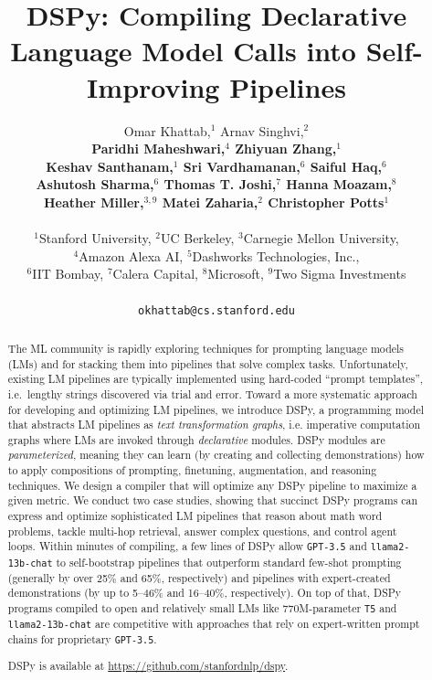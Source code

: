 \documentclass{article} %
\title{DSPy: Compiling Declarative Language Model Calls into Self-Improving Pipelines}
\author{Omar Khattab,$^{1}$ Arnav Singhvi,$^{2}$\\
\textbf{Paridhi Maheshwari,$^{4}$ Zhiyuan Zhang,$^{1}$} \\
\textbf{Keshav Santhanam,$^{1}$ Sri Vardhamanan,$^{6}$ Saiful Haq,$^{6}$} \\
\textbf{Ashutosh Sharma,$^{6}$ Thomas T. Joshi,$^{7}$ Hanna Moazam,$^{8}$} \\
\textbf{Heather Miller,${}^{3,9}$ Matei Zaharia,$^{2}$ 
Christopher Potts$^{1}$}
\\  \\
${}^{1}$Stanford University, 
${}^{2}$UC Berkeley, 
${}^{3}$Carnegie Mellon University,\\
${}^{4}$Amazon Alexa AI,
${}^{5}$Dashworks Technologies, Inc.,\\
${}^{6}$IIT Bombay,
${}^{7}$Calera Capital,
${}^{8}$Microsoft,
${}^{9}$Two Sigma Investments
\\
\\
\texttt{okhattab@cs.stanford.edu} \\
}
\newcommand{\gptThreeFive}{\texttt{GPT-3.5}}
\newcommand{\llamaThirteenChat}{\texttt{llama2-13b-chat}}
\begin{document}
\maketitle

\begin{abstract} %

The ML community is rapidly exploring techniques for prompting language models (LMs) and for stacking them into pipelines that solve complex tasks.
Unfortunately, existing LM pipelines
are typically implemented using hard-coded %
``prompt templates'', i.e.~lengthy strings
discovered via trial and error. %
Toward a more systematic approach for developing and optimizing LM pipelines, we introduce DSPy, a programming model that abstracts LM pipelines as \textit{text transformation graphs}, i.e. imperative %
computation graphs where LMs are invoked through \textit{declarative} modules. %
DSPy modules are \textit{parameterized}, meaning they can learn (by creating and collecting demonstrations) how to apply compositions of prompting, finetuning, augmentation, and reasoning techniques. %
We design a compiler that will optimize any DSPy pipeline to maximize a given metric. We conduct two case studies, showing that succinct DSPy programs can express and optimize sophisticated LM pipelines that reason about math word problems, tackle multi-hop retrieval, answer complex questions, and control agent loops. %
Within minutes of compiling, a few lines of DSPy allow \gptThreeFive{} and \llamaThirteenChat{} to self-bootstrap pipelines that outperform standard few-shot prompting (generally by over 25\% and 65\%, respectively) and pipelines with expert-created demonstrations (by up to 5--46\% and 16--40\%, respectively). On top of that, DSPy programs compiled to open and relatively small LMs like 770M-parameter \texttt{T5} and \llamaThirteenChat{} are competitive with approaches that rely on expert-written prompt chains for proprietary \gptThreeFive{}.
















DSPy is available at \url{https://github.com/stanfordnlp/dspy}.
\end{abstract}
\end{document}
